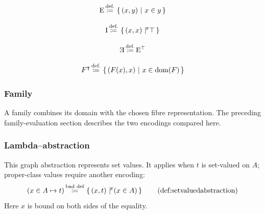 \fi %
\begin{definition}
\[
\mathrm{E}\,{\stackrel{{\textrm{def.}}}{\coloneqq}}\,\left\{\,(x,y)\ \middle|\ x\in y\,\right\}
\]
\end{definition}
\begin{definition}

\[
\I\eqdef\ccc{x}{(x,x)}{\top}
\]
\end{definition}
%
\begin{notation}
\[
\invE \eqdef \E^\top
\]
\end{notation}
\begin{definition}[transposition]%
\[
F^\intercal\,{\stackrel{{\textrm{def.}}}{\coloneqq}}\,\left\{\,(F(x),x)\ \middle|\ x\in \mathrm{dom}(F)\,\right\}
\]
\end{definition}

\subsubsection{Family}
A family combines its domain with the chosen fibre representation.
The preceding family-evaluation section describes the two encodings
compared here.
\iffalse %
\begin{definition}[family]
Def is ommited!
\end{definition}

\begin{definition}[domain]%
\[
\dom(F)\eqdef \cc{x}{\exists b,\ (x,b)\in F}
\]
\end{definition}

\begin{definition}[value]%
\[
F(x) \eqdef \bigcup\cc{c}{((x,c)\in F)}
\]

\end{definition}
\fi %

\subsubsection{Lambda--abstraction}
\begin{baddefinition*}
This graph abstraction represents set values. It applies when $t$ is
set-valued on $A$; proper-class values require another encoding:
\[
(x\in A \mapsto t)
\eqbaddef
\ccc{x}{(x,t)}{(x\in A)}
\clabeltagd{def}{setvaluedabstraction}
\]
Here $x$ is bound on both sides of the equality.
\end{baddefinition*}

